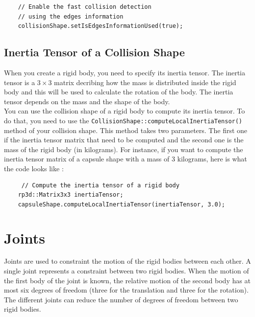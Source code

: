 \documentclass[a4paper,12pt]{article}
\begin{document}
     \begin{lstlisting}
    // Enable the fast collision detection
    // using the edges information
    collisionShape.setIsEdgesInformationUsed(true);
  \end{lstlisting}

    \subsection{Inertia Tensor of a Collision Shape}

    When you create a rigid body, you need to specify its inertia tensor. The inertia tensor is a $3 \times 3$ matrix decribing how the mass is distributed inside the rigid body and this
    will be used to calculate the rotation of the body. The inertia tensor depends on the mass and the shape of the body. \\

    You can use the collision shape of a rigid body to compute its inertia tensor. To do that, you need to use the \texttt{CollisionShape::computeLocalInertiaTensor()} method of your collision
    shape. This method takes two parameters. The first one if the inertia tensor matrix that need to be computed and the second one is the mass of the rigid body (in kilograms). For instance,
    if you want to compute the inertia tensor matrix of a capsule shape with a mass of 3 kilograms, here is what the code looks like : \\

    \begin{lstlisting}
     // Compute the inertia tensor of a rigid body
    rp3d::Matrix3x3 inertiaTensor;
    capsuleShape.computeLocalInertiaTensor(inertiaTensor, 3.0);
  \end{lstlisting}

    \section{Joints}

    Joints are used to constraint the motion of the rigid bodies between each other. A single joint represents a constraint between two rigid bodies.
    When the motion of the first body of the joint is known, the relative motion of the second body has at most six degrees of freedom (three for the
    translation and three for the rotation). The different joints can reduce the number of degrees of freedom between two rigid bodies. \\
\end{document}
